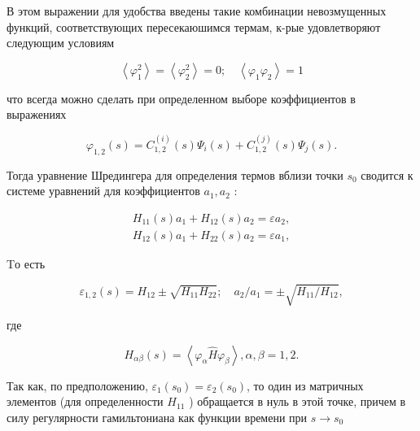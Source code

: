 \documentclass[10pt]{article}
\begin{document}
В этом выражении для удобства введены такие комбинации невозмущенных функций, соответствующих пересекаюшимся термам, к-рые удовлетворяют следующим условиям



\[

\left\langle\varphi_{1}^{2}\right\rangle=\left\langle\varphi_{2}^{2}\right\rangle=0 ; \quad\left\langle\varphi_{1} \varphi_{2}\right\rangle=1

\]



что всегда можно сделать при определенном выборе коэффициентов в выражениях



\[

\varphi_{1,2}(s)=C_{1,2}^{(i)}(s) \Psi_{i}(s)+C_{1,2}^{(j)}(s) \Psi_{j}(s) .

\]



Тогда уравнение Шредингера для определения термов вблизи точки $s_{0}$ сводится к системе уравнений для коэффициентов $a_{1}, a_{2}$ :



\[

\begin{gathered}

H_{11}(s) a_{1}+H_{12}(s) a_{2}=\varepsilon a_{2}, \\

H_{12}(s) a_{1}+H_{22}(s) a_{2}=\varepsilon a_{1},

\end{gathered}

\]



Tо есть



\[

\varepsilon_{1,2}(s)=H_{12} \pm \sqrt{H_{11} H_{22}} ; \quad a_{2} / a_{1}= \pm \sqrt{H_{11} / H_{12}},

\]



где



\[

H_{\alpha \beta}(s)=\left\langle\varphi_{\alpha} \hat{H} \varphi_{\beta}\right\rangle, \alpha, \beta=1,2 .

\]



Так как, по предположению, $\varepsilon_{1}\left(s_{0}\right)=\varepsilon_{2}\left(s_{0}\right)$, то один из матричных элементов (для определенности $H_{11}$ ) обращается в нуль в этой точке, причем в силу регулярности гамильтониана как функции времени при $s \rightarrow s_{0}$
\end{document}
